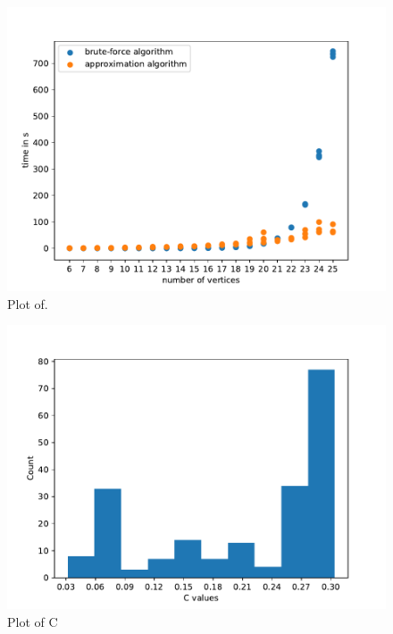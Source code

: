 \begin{figure}
	\centering
	\includegraphics[scale=1]{figures/number_vertices_all_logs.pdf}
	\caption[Plot ]{Plot of.}
\end{figure}

\begin{figure}
	\centering
	\includegraphics[scale=1]{figures/quality_evaluation_log_C_estimates.pdf}
	\caption[Plot C]{Plot of C}
\end{figure}




